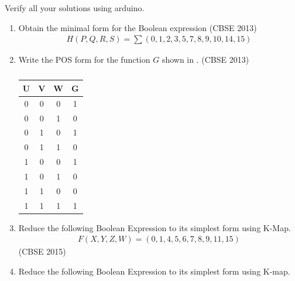 Verify all your solutions using arduino.
\begin{enumerate}[label=\arabic*.,ref=\theenumi]
	\item 		Obtain the minimal form for the Boolean expression
\hfill (CBSE 2013)
\label{prob:2013/d/6/d}
		\begin{align*}
H(P,Q,R,S)=\sum(0,1,2,3,5,7,8,9,10,14,15)
		\end{align*}
	\item Write the POS form for the function $G$ shown in 
.
\hfill (CBSE 2013)
\label{prob:2013/c/6/d}
		\begin{table}[H]
			\centering
		\begin{tabular}{ |c |c |c |c |}
 \hline
 U  &  V  &  W  &  G\\
 \hline
 0  &  0  &  0  &  1\\
 \hline
 0  &  0  &  1  &  0\\
 \hline
 0  &  1  &  0  &  1\\
 \hline
 0  &  1  &  1  &  0\\
 \hline
 1  &  0  &  0  &  1\\
 \hline
 1  &  0  &  1  &  0\\
 \hline
 1  &  1  &  0  &  0\\
 \hline
 1  &  1  &  1  &  1\\
 \hline
 \end{tabular}
			\caption{}
\label{tab:2013/c/6/d}
 \end{table}
	\item Reduce the following Boolean Expression to its simplest form using K-Map.
\label{prob:2015-1/c/6/d}
		\begin{align*}
			F(X,Y,Z,W)=(0,1,4,5,6,7,8,9,11,15)
		\end{align*}
\hfill (CBSE 2015)
	\item 
\label{prob:2015/c/6/d}
		Reduce the following Boolean Expression to its simplest form using K-map.


\end{enumerate}
